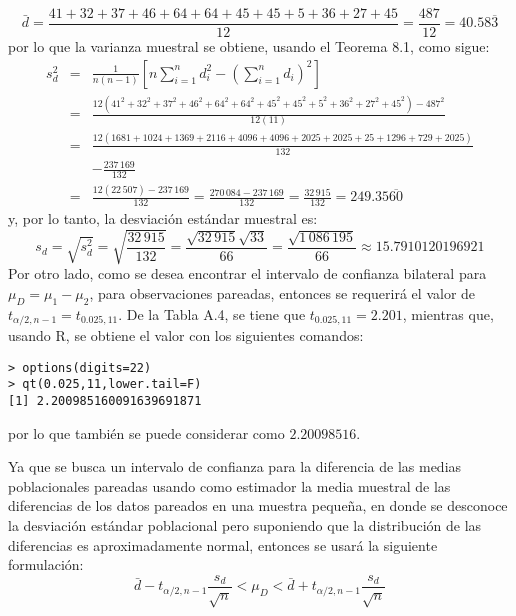 \begin{solucion}
 \begin{equation*}
  \bar{d} = \frac{41 + 32 + 37 + 46 + 64 + 64 + 45 + 45 + 5 + 36 + 27 + 45}{12} = \frac{487}{12} = 40.58\overline{3}
 \end{equation*}
 por lo que la varianza muestral se obtiene, usando el Teorema 8.1, como sigue:
 \begin{eqnarray*}
  s_d^2 & = & \frac{1}{n(n-1)} \left[ n \sum_{i=1}^n d_i^2 - \left( \sum_{i=1}^n d_i \right)^2 \right] \\
  & = & \frac{12\left( 41^2 + 32^2 + 37^2 + 46^2 + 64^2 + 64^2 + 45^2 + 45^2 + 5^2 + 36^2 + 27^2 + 45^2 \right) - 487^2}{12(11)} \\
  & = & \frac{12\left( 1681 + 1024 + 1369 + 2116 + 4096 + 4096 + 2025 + 2025 + 25 + 1296 + 729 + 2025 \right)}{132} \\
  & & - \frac{237\,169}{132} \\
  & = & \frac{ 12(22\,507) - 237\,169}{132} = \frac{270\,084 - 237\,169}{132} = \frac{32\,915}{132} = 249.35\overline{60}
 \end{eqnarray*}
 y, por lo tanto, la desviaci\'on est\'andar muestral es:
 \begin{equation*}
  s_d = \sqrt{s_d^2} = \sqrt{\frac{32\,915}{132}} = \frac{\sqrt{32\,915}\sqrt{33}}{66} = \frac{\sqrt{1\,086\,195}}{66} \approx 15.7910120196921
 \end{equation*}
 Por otro lado, como se desea encontrar el intervalo de confianza bilateral para $\mu_D = \mu_1 - \mu_2$, para observaciones pareadas, entonces se requerir\'a el valor de $t_{\alpha/2,n-1} = t_{0.025,11}$. De la Tabla A.4, se tiene que $t_{0.025,11} = 2.201$, mientras que, usando R, se obtiene el valor con los siguientes comandos:
 \begin{verbatim}
> options(digits=22)
> qt(0.025,11,lower.tail=F)
[1] 2.200985160091639691871
 \end{verbatim}
 \vspace{-0.5cm}
 por lo que tambi\'en se puede considerar como $2.20098516$.
 \par 
 Ya que se busca un intervalo de confianza para la diferencia de las medias poblacionales pareadas usando como estimador la media muestral de las diferencias de los datos pareados en una muestra peque\~na, en donde se desconoce la desviaci\'on est\'andar poblacional pero suponiendo que la distribuci\'on de las diferencias es aproximadamente normal, entonces se usar\'a la siguiente formulaci\'on:
 \begin{equation*}
  \bar{d} - t_{\alpha/2,n-1}\frac{s_d}{\sqrt{n}} < \mu_D < \bar{d} + t_{\alpha/2,n-1}\frac{s_d}{\sqrt{n}}

\end{equation*}
\end{solucion}

